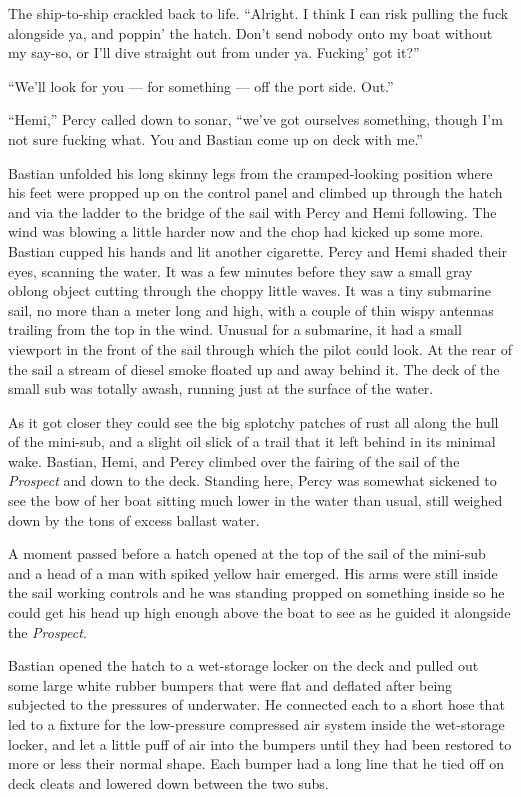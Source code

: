 \documentclass[
]{scrbook}
\begin{document}
The ship-to-ship crackled back to life. ``Alright. I think I can risk
pulling the fuck alongside ya, and poppin' the hatch. Don't send nobody
onto my boat without my say-so, or I'll dive straight out from under ya.
Fucking' got it?''

``We'll look for you --- for something --- off the port side. Out.''

``Hemi,'' Percy called down to sonar, ``we've got ourselves something,
though I'm not sure fucking what. You and Bastian come up on deck with
me.''

Bastian unfolded his long skinny legs from the cramped-looking position
where his feet were propped up on the control panel and climbed up
through the hatch and via the ladder to the bridge of the sail with
Percy and Hemi following. The wind was blowing a little harder now and
the chop had kicked up some more. Bastian cupped his hands and lit
another cigarette. Percy and Hemi shaded their eyes, scanning the water.
It was a few minutes before they saw a small gray oblong object cutting
through the choppy little waves. It was a tiny submarine sail, no more
than a meter long and high, with a couple of thin wispy antennas
trailing from the top in the wind. Unusual for a submarine, it had a
small viewport in the front of the sail through which the pilot could
look. At the rear of the sail a stream of diesel smoke floated up and
away behind it. The deck of the small sub was totally awash, running
just at the surface of the water.

As it got closer they could see the big splotchy patches of rust all
along the hull of the mini-sub, and a slight oil slick of a trail that
it left behind in its minimal wake. Bastian, Hemi, and Percy climbed
over the fairing of the sail of the \emph{Prospect} and down to the
deck. Standing here, Percy was somewhat sickened to see the bow of her
boat sitting much lower in the water than usual, still weighed down by
the tons of excess ballast water.

A moment passed before a hatch opened at the top of the sail of the
mini-sub and a head of a man with spiked yellow hair emerged. His arms
were still inside the sail working controls and he was standing propped
on something inside so he could get his head up high enough above the
boat to see as he guided it alongside the \emph{Prospect}.

Bastian opened the hatch to a wet-storage locker on the deck and pulled
out some large white rubber bumpers that were flat and deflated after
being subjected to the pressures of underwater. He connected each to a
short hose that led to a fixture for the low-pressure compressed air
system inside the wet-storage locker, and let a little puff of air into
the bumpers until they had been restored to more or less their normal
shape. Each bumper had a long line that he tied off on deck cleats and
lowered down between the two subs.
\end{document}
